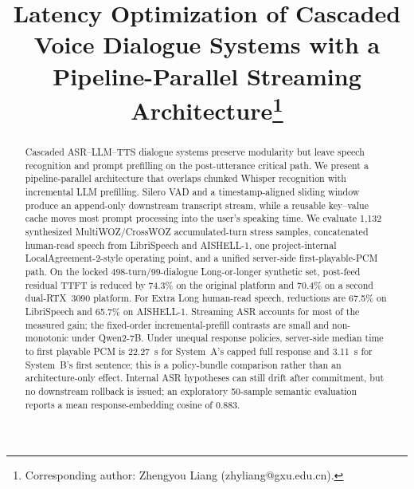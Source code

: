 \documentclass[conference]{IEEEtran}
\begin{document}
\makeatletter
\def\@textbottom{\vskip \z@ \@plus.0001fil}
\makeatother

\title{Latency Optimization of Cascaded Voice Dialogue Systems with a Pipeline-Parallel Streaming Architecture\thanks{Corresponding author: Zhengyou Liang (zhyliang@gxu.edu.cn).}}

\author{
\and
{}
}

\maketitle

\begin{abstract}
Cascaded ASR--LLM--TTS dialogue systems preserve modularity but leave speech recognition and prompt prefilling on the post-utterance critical path. We present a pipeline-parallel architecture that overlaps chunked Whisper recognition with incremental LLM prefilling. Silero VAD and a timestamp-aligned sliding window produce an append-only downstream transcript stream, while a reusable key--value cache moves most prompt processing into the user's speaking time. We evaluate 1,132 synthesized MultiWOZ/CrossWOZ accumulated-turn stress samples, concatenated human-read speech from LibriSpeech and AISHELL-1, one project-internal LocalAgreement-2-style operating point, and a unified server-side first-playable-PCM path. On the locked 498-turn/99-dialogue Long-or-longer synthetic set, post-feed residual TTFT is reduced by 74.3\% on the original platform and 70.4\% on a second dual-RTX~3090 platform. For Extra Long human-read speech, reductions are 67.5\% on LibriSpeech and 65.7\% on AISHELL-1. Streaming ASR accounts for most of the measured gain; the fixed-order incremental-prefill contrasts are small and non-monotonic under Qwen2-7B. Under unequal response policies, server-side median time to first playable PCM is 22.27~s for System~A's capped full response and 3.11~s for System~B's first sentence; this is a policy-bundle comparison rather than an architecture-only effect. Internal ASR hypotheses can still drift after commitment, but no downstream rollback is issued; an exploratory 50-sample semantic evaluation reports a mean response-embedding cosine of 0.883.
\end{abstract}
\end{document}
